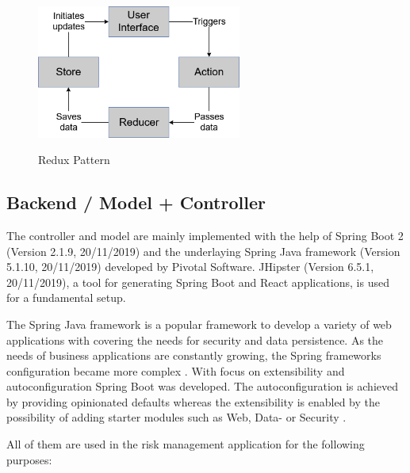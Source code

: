 \begin{figure}[h]
	\centering
	\includegraphics[width=0.6\textwidth]{Content/Domain/ReduxPattern.png}
	\caption{Redux Pattern}
	\cite{own representation}
	\label{fig:reduxpattern}
\end{figure}

\subsection{Backend / Model + Controller}
\label{sec:DomainCc}
The controller and model are mainly implemented with the help of Spring Boot 2 (Version 2.1.9, 20/11/2019) and the underlaying Spring Java framework (Version 5.1.10,  20/11/2019) developed by Pivotal Software. JHipster (Version 6.5.1, 20/11/2019), a tool for generating Spring Boot and React applications, is used for a fundamental setup.

The Spring Java framework is a popular framework to develop a variety of web applications with covering the needs for security and data persistence. As the needs of business applications are constantly growing, the Spring frameworks configuration became more complex \cite[p. 1]{prasadreddyBeginningSpringBoot2017}. With focus on extensibility and autoconfiguration Spring Boot was developed. The autoconfiguration is achieved by providing opinionated defaults whereas the extensibility is enabled by the possibility of adding starter modules such as Web, Data-  or Security \cite[p. 21-22]{prasadreddyBeginningSpringBoot2017}. 

All of them are used in the risk management application for the following purposes:

